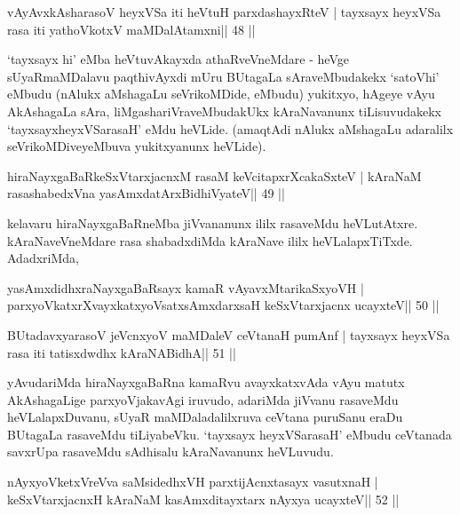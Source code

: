 \begin{shl}
vAyAvxkAsharasoV heyxVSa iti heVtuH parxdashayxRteV |
tayxsayx heyxVSa rasa iti yathoVkotxV maMDalAtamxni\hfill || 48 ||
\end{shl}

\begin{artha}
`tayxsayx hi' eMba heVtuvAkayxda athaRveVneMdare - heVge sUyaRmaMDalavu paqthivAyxdi mUru BUtagaLa sAraveMbudakekx `satoVhi' eMbudu (nAlukx aMshagaLu seVrikoMDide, eMbudu) yukitxyo, hAgeye vAyu AkAshagaLa sAra, liMgashariVraveMbudakUkx kAraNavanunx tiLisuvudakekx `tayxsayxheyxVSarasaH' eMdu heVLide. (amaqtAdi nAlukx aMshagaLu adaralilx seVrikoMDiveyeMbuva yukitxyanunx heVLide).
\end{artha}



\begin{shl}
hiraNayxgaBaRkeSxVtarxjacnxM rasaM keVcitapxrXcakaSxteV |
kAraNaM rasashabedxVna yasAmxdatArxBidhiVyateV\hfill || 49 ||
\end{shl}

\begin{artha}
kelavaru hiraNayxgaBaRneMba jiVvananunx ililx rasaveMdu
heVLutAtxre. kAraNaveVneMdare rasa shabadxdiMda kAraNave ililx
heVLalapxTiTxde. AdadxriMda, 
\end{artha}


\begin{shl}
yasAmxdidhxraNayxgaBaRsayx kamaR vAyavxMtarikaSxyoVH |
parxyoVkatxrXvayxkatxyoVsatxsAmxdarxsaH keSxVtarxjacnx ucayxteV\hfill || 50 ||
\end{shl}

\begin{shl}
BUtadavxyarasoV jeVcnxyoV maMDaleV ceVtanaH pumAnf |
tayxsayx heyxVSa rasa iti tatisxdwdhx kAraNABidhA\hfill || 51 ||
\end{shl}

\begin{artha}
yAvudariMda hiraNayxgaBaRna kamaRvu avayxkatxvAda vAyu matutx AkAshagaLige parxyoVjakavAgi iruvudo, adariMda jiVvanu rasaveMdu heVLalapxDuvanu, sUyaR maMDaladalilxruva ceVtana puruSanu eraDu BUtagaLa rasaveMdu tiLiyabeVku. `tayxsayx heyxVSarasaH' eMbudu ceVtanada savxrUpa rasaveMdu sAdhisalu kAraNavanunx heVLuvudu.
\end{artha}

\begin{shl}
nAyxyoVketxVreVva saMsidedhxVH parxtijAcnxtasayx vasutxnaH |
keSxVtarxjacnxH kAraNaM kasAmxditayxtarx nAyxya ucayxteV\hfill || 52 ||
\end{shl}

